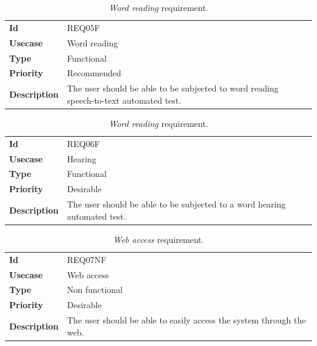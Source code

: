 \begin{table}[h!t]
    \centering
    \caption{\emph{Word reading} requirement.}
    \label{tab:req:word}
    \centering
    \begin{tabular}{l | p{80mm}}
        \textbf{Id}          & REQ05F                                                                                 \\
        \textbf{Usecase}     & Word reading                                                                           \\
        \textbf{Type}        & Functional                                                                             \\
        \textbf{Priority}    & Recommended                                                                            \\
        \textbf{Description} & The user should be able to be subjected to word reading speech-to-text automated test.
    \end{tabular}
\end{table}

\begin{table}[h!t]
    \centering
    \caption{\emph{Word reading} requirement.}
    \label{tab:req:hearing}
    \centering
    \begin{tabular}{l | p{80mm}}
        \textbf{Id}          & REQ06F                                                                    \\
        \textbf{Usecase}     & Hearing                                                                   \\
        \textbf{Type}        & Functional                                                                \\
        \textbf{Priority}    & Desirable                                                                 \\
        \textbf{Description} & The user should be able to be subjected to a word hearing automated test.
    \end{tabular}
\end{table}

\begin{table}[h!t]
    \centering
    \caption{\emph{Web access} requirement.}
    \label{tab:req:access:web}
    \centering
    \begin{tabular}{l | p{80mm}}
        \textbf{Id}          & REQ07NF                                                              \\
        \textbf{Usecase}     & Web access                                                           \\
        \textbf{Type}        & Non functional                                                       \\
        \textbf{Priority}    & Desirable                                                            \\
        \textbf{Description} & The user should be able to easily access the system through the web.
    \end{tabular}
\end{table}

